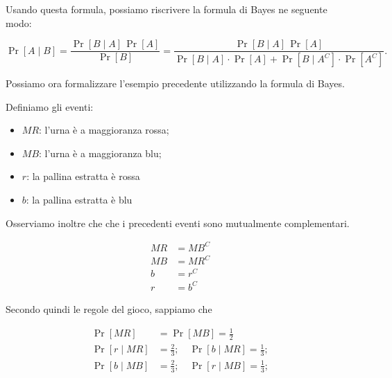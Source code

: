 Usando questa formula, possiamo riscrivere la formula di Bayes ne seguente modo:

\[
    \Pr[A\mid B]= \frac{\Pr[B\mid A]\,\Pr[A]}{\Pr[B]} = \frac{\Pr[B\mid A]\,\Pr[A]}{\Pr[B \mid A] \cdot \Pr[A] + \Pr[B \mid A^C] \cdot \Pr[A^C]}.
\]

Possiamo ora formalizzare l'esempio precedente utilizzando la formula di Bayes.

Definiamo gli eventi:
\begin{itemize}
    \item $MR$: l'urna è a maggioranza rossa;
    \item $MB$: l'urna è a maggioranza blu;
    \item $r$: la pallina estratta è rossa
    \item $b$: la pallina estratta è blu
\end{itemize}

Osserviamo inoltre che che i precedenti eventi sono mutualmente complementari.

\begin{align*}
    MR &= MB^C \\
    MB &= MR^C \\
    b &= r^C \\
    r &= b^C
\end{align*}

Secondo quindi le regole del gioco, sappiamo che

\begin{align*}
    \Pr[MR] &= \Pr[MB] = \frac{1}{2} \\
    \Pr[r \mid MR] &= \frac{2}{3}; \quad \Pr[b \mid MR] = \frac{1}{3}; \\
    \Pr[b \mid MB] &= \frac{2}{3}; \quad \Pr[r \mid MB] = \frac{1}{3}; 
\end{align*}

